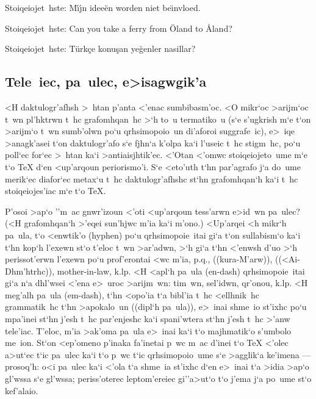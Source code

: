 \exercise Stoiqeiojet~hste: 
{\rm M\'\i\'\j n idee\"en worden niet be\"\i nvloed. }

\exercise Stoiqeiojet~hste: 
{\rm Can you take a ferry from \"Oland to \AA land? }

\exercise Stoiqeiojet~hste:
{\rm T\"urk\c ce konu\c san ye\u genler nasillar? }


\subsection{Tele~iec, pa~ulec, e>isagwgik'a\bdots}

<H daktulogr'afhsh >~htan p'anta <'enac sumbibasm'oc. <O mikr`oc   
>arijm`oc t~wn pl'h\-ktrwn t~hc grafo\-mhqan~hc >`h to~u termatiko~u 
(s`e s'ugkrish m`e t`on >arijm`o t~wn sumb'olwn po`u qrhsimopoio~un
di'aforoi suggrafe~ic), e>~iqe >anagk'asei t`on daktulogr'afo s`e fjhn`a
k'olpa ka`i l'useic t~hc stigm~hc, po`u poll`ec for`ec >~htan ka`i
>anti\-aisjh\-tik'ec.  <'Otan <'omwc stoiqeiojeto~ume m`e t`o {\rm \TeX}
d`en <up'arqoun peri\-orismo'i. S`e <eto'uth t`hn par'agrafo j`a do~ume
merik`ec diafor`ec metax`u t~hc daktu\-logr'a\-fhshc st`hn grafomhqan`h
ka`i t~hc stoiqeiojes'iac m`e t`o {\rm \TeX}.

P'osoi >ap`o ''m~ac gnwr'izoun <'oti <up'arqoun tess'arwn e>id~wn
pa~ulec? (<H grafo\-mhqa\-n`h >'eqei sun'hjwc m'ia ka`i m'ono.) 
<Up'arqei <h mikr`h pa~ula, t`o {\tengs <enwtik'o\/} ({\rm hyphen}) po`u
qrhsimopoie~itai gi`a t`on sullabism`o ka`i t`hn kop`h l'exewn st`o
t'eloc t~wn >ar'adwn, >`h gi`a t`hn <'enwsh d'uo >`h peris\-sot'erwn
l'exewn po`u prof'erontai <wc m'ia, p.q., ((kura-M'arw)),
((<Ai-Dhm'htrhc)), {\rm mother-in-law}, k.lp. <H {\tengs
<apl`h pa~u\-la\/} ({\rm en-dash}) qrhsimopoie~itai gi`a n`a dhl'wsei
<'ena e>~uroc >arijm~wn: tim~wn, sel'idwn, qr'onou, k.lp. <H {\tengs
meg'alh pa~ula\/} ({\rm em-dash}), t`hn <opo'ia t`a bibl'ia t~hc
<ellhnik~hc grammatik~hc t`hn >apokalo~un ((dipl`h pa~ula)), e>~inai
shme~io st'ixhc po`u mpa'inei st`hn j'esh t~hc par'enjeshc ka`i
spani'wtera st`hn j'esh t~hc >'anw tele'iac. T'eloc, m'ia >ak'oma pa~ula
e>~inai ka`i t`o ma\-jh\-matik`o s'umbolo {\tengs me~ion}.  St`on
<ep'omeno p'inaka fa'inetai p~wc m~ac d'inei t`o {\rm \TeX} <'olec
a>ut`ec t`ic pa~ulec ka`i t`o p~wc t`ic qrhsimopoio~ume s`e >agglik`a
ke'imena --- prosoq'h: o<i pa~ulec ka`i <'ola t`a shme~ia st'ixhc d`en
e>~inai t`a >idia >ap`o gl'wssa s`e gl'wssa; periss'oterec leptom'ereiec
gi''\NB a>ut`o t`o j'ema j`a po~ume st`o kef'alaio.

